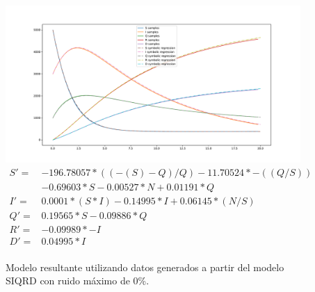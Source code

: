 \begin{figure}[h]
    \centering
    \includegraphics[width=\textwidth]{"figures/final_plot_SIQRD_0.0.pdf"}
    \begin{align*}
        S' = & -196.78057 * ((-(S) - Q) / Q) -11.70524 * -((Q / S)) \\
             & -0.69603 * S -0.00527 * N + 0.01191 * Q              \\
        I' = & 0.0001 * (S * I) -0.14995 * I + 0.06145 * (N / S)    \\
        Q' = & 0.19565 * S -0.09886 * Q                             \\
        R' = & -0.09989 * -I                                        \\
        D' = & 0.04995 * I                                          \\
    \end{align*}
    \caption{Modelo resultante utilizando datos generados a partir del modelo SIQRD con ruido máximo de 0\%.}
    \label{fig:final_plot_SIQRD_0.0}
\end{figure}


